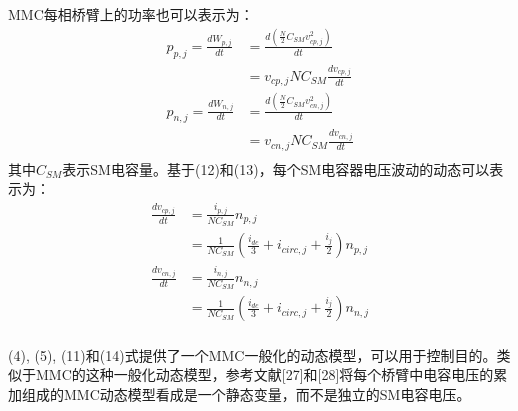   MMC每相桥臂上的功率也可以表示为：
\begin{align*}
p_{p, j} = \frac{dW_{p, j}}{dt} &= \frac{d(\frac{N}{2}C_{SM}v^2_{cp, j})}{dt}\\
&= v_{cp, j}NC_{SM}\frac{dv_{cp, j}}{dt}\tag{13a}\\
p_{n, j} = \frac{dW_{n, j}}{dt} &= \frac{d(\frac{N}{2}C_{SM}v^2_{cn, j})}{dt}\\
&= v_{cn, j}NC_{SM}\frac{dv_{cn, j}}{dt}\tag{13b}\\
\end{align*}
其中$C_{SM}$表示SM电容量。基于(12)和(13)，每个SM电容器电压波动的动态可以表示为：
\begin{align*}
\frac{dv_{cp, j}}{dt} &= \frac{i_{p, j}}{NC_{SM}}n_{p, j}\\
&= \frac{1}{NC_{SM}}(\frac{i_{dc}}{3} + i_{circ, j} + \frac{i_j}{2})n_{p, j}\tag{14a}\\
\frac{dv_{cn, j}}{dt} &= \frac{i_{n, j}}{NC_{SM}}n_{n, j}\\
&= \frac{1}{NC_{SM}}(\frac{i_{dc}}{3} + i_{circ, j} + \frac{i_j}{2})n_{n, j}\tag{14b}\\
\end{align*}  
  
  (4), (5), (11)和(14)式提供了一个MMC一般化的动态模型，可以用于控制目的。类似于MMC的这种一般化动态模型，参考文献[27]和[28]将每个桥臂中电容电压的累加组成的MMC动态模型看成是一个静态变量，而不是独立的SM电容电压。

